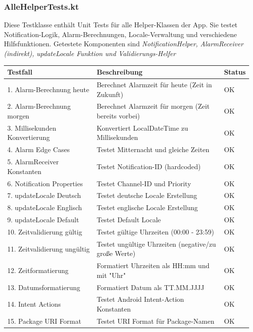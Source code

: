 \documentclass[a4paper,12pt]{article}
\begin{document}
\subsubsection{AlleHelperTests.kt}
Diese Testklasse enthält Unit Tests für alle Helper-Klassen der App. Sie testet Notification-Logik, Alarm-Berechnungen, Locale-Verwaltung und verschiedene Hilfsfunktionen.
Getestete Komponenten sind \textit{NotificationHelper, AlarmReceiver (indirekt), updateLocale Funktion und Validierungs-Helfer}\\
\vspace{1em}

\begin{tabularx}{\textwidth}{|l|X|l|}
\hline
\textbf{Testfall} & \textbf{Beschreibung} & \textbf{Status} \\
\hline
1. Alarm-Berechnung heute & Berechnet Alarmzeit für heute (Zeit in Zukunft) & OK \\
\hline
2. Alarm-Berechnung morgen & Berechnet Alarmzeit für morgen (Zeit bereits vorbei) & OK \\
\hline
3. Millisekunden Konvertierung & Konvertiert LocalDateTime zu Millisekunden & OK \\
\hline
4. Alarm Edge Cases & Testet Mitternacht und gleiche Zeiten & OK \\
\hline
5. AlarmReceiver Konstanten & Testet Notification-ID (hardcoded) & OK \\
\hline
6. Notification Properties & Testet Channel-ID und Priority & OK \\
\hline
7. updateLocale Deutsch & Testet deutsche Locale Erstellung & OK \\
\hline
8. updateLocale Englisch & Testet englische Locale Erstellung & OK \\
\hline
9. updateLocale Default & Testet Default Locale & OK \\
\hline
10. Zeitvalidierung gültig & Testet gültige Uhrzeiten (00:00 - 23:59) & OK \\
\hline
11. Zeitvalidierung ungültig & Testet ungültige Uhrzeiten (negative/zu große Werte) & OK \\
\hline
12. Zeitformatierung & Formatiert Uhrzeiten als HH:mm und mit "Uhr" & OK \\
\hline
13. Datumsformatierung & Formatiert Datum als TT.MM.JJJJ & OK \\
\hline
14. Intent Actions & Testet Android Intent-Action Konstanten & OK \\
\hline
15. Package URI Format & Testet URI Format für Package-Namen & OK \\

\end{tabularx}
\end{document}
